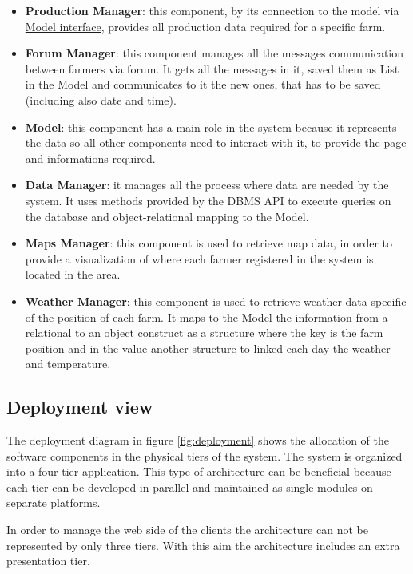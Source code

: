 \begin{itemize}
    \item \textbf{Production Manager}: this component, by its connection to the model via \underline{Model interface}, provides all production data required for a specific farm. 
    \item \textbf{Forum Manager}: this component manages all the messages communication between farmers via forum. It gets all the messages in it, saved them as List in the Model and communicates to it the new ones, that has to be saved (including also date and time).
    \item \textbf{Model}: this component has a main role in the system because it represents the data so all other components need to interact with it, to provide the page and informations required.
    \item \textbf{Data Manager}: it manages all the process where data are needed by the system. It uses methods provided by the DBMS API to execute queries on the database and object-relational mapping to the Model.
    \item \textbf{Maps Manager}: this component is used to retrieve map data, in order to provide a visualization of where each farmer registered in the system is located in the area.
    \item \textbf{Weather Manager}: this component is used to retrieve weather data specific of the position of each farm. It maps to the Model the information from a relational to an object construct as a structure where the key is the farm position and in the value another structure to linked each day the weather and temperature.
\end{itemize}

\subsection{Deployment view}
The deployment diagram in figure \ref{fig:deployment} shows the allocation of the software components in the physical tiers of the system. 
The system is organized into a four-tier application. This type of architecture can be 
beneficial because each tier can be developed in parallel and maintained as single modules on separate platforms.

In order to manage the web side of the clients the architecture can not be represented by only three tiers. With this aim the architecture includes an extra presentation tier. 

